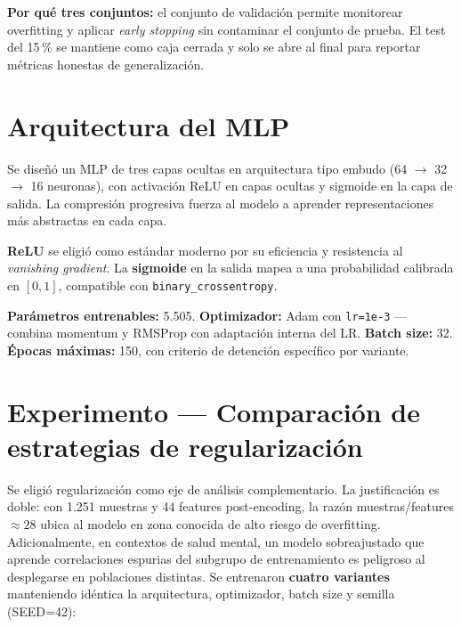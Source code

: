 \documentclass[10pt,a4paper,twocolumn]{article}
\begin{document}
\textbf{Por qué tres conjuntos:} el conjunto de validación permite monitorear overfitting y aplicar \textit{early stopping} sin contaminar el conjunto de prueba. El test del 15\,\% se mantiene como caja cerrada y solo se abre al final para reportar métricas honestas de generalización.

\section{Arquitectura del MLP}

Se diseñó un MLP de tres capas ocultas en arquitectura tipo embudo (64 $\rightarrow$ 32 $\rightarrow$ 16 neuronas), con activación ReLU en capas ocultas y sigmoide en la capa de salida. La compresión progresiva fuerza al modelo a aprender representaciones más abstractas en cada capa.

\textbf{ReLU} se eligió como estándar moderno por su eficiencia y resistencia al \textit{vanishing gradient}. La \textbf{sigmoide} en la salida mapea a una probabilidad calibrada en $[0,1]$, compatible con \texttt{binary\_crossentropy}.

\textbf{Parámetros entrenables:} 5.505. \textbf{Optimizador:} Adam con \texttt{lr=1e-3} — combina momentum y RMSProp con adaptación interna del LR. \textbf{Batch size:} 32. \textbf{Épocas máximas:} 150, con criterio de detención específico por variante.

\section{Experimento — Comparación de estrategias de regularización}

Se eligió regularización como eje de análisis complementario. La justificación es doble: con 1.251 muestras y 44 features post-encoding, la razón muestras/features $\approx 28$ ubica al modelo en zona conocida de alto riesgo de overfitting. Adicionalmente, en contextos de salud mental, un modelo sobreajustado que aprende correlaciones espurias del subgrupo de entrenamiento es peligroso al desplegarse en poblaciones distintas. Se entrenaron \textbf{cuatro variantes} manteniendo idéntica la arquitectura, optimizador, batch size y semilla (SEED=42):
\end{document}
